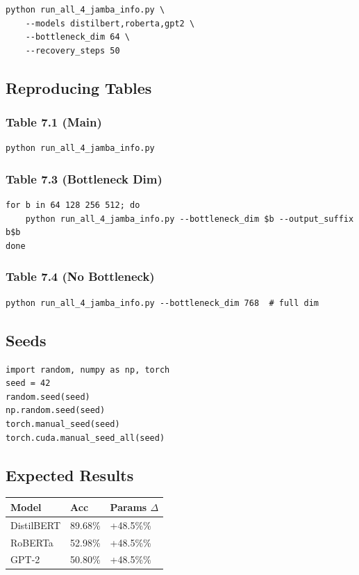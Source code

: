 \begin{lstlisting}
python run_all_4_jamba_info.py \
    --models distilbert,roberta,gpt2 \
    --bottleneck_dim 64 \
    --recovery_steps 50
\end{lstlisting}

\subsection{Reproducing Tables}

\subsubsection{Table 7.1 (Main)}
\begin{lstlisting}
python run_all_4_jamba_info.py
\end{lstlisting}

\subsubsection{Table 7.3 (Bottleneck Dim)}
\begin{lstlisting}
for b in 64 128 256 512; do
    python run_all_4_jamba_info.py --bottleneck_dim $b --output_suffix b$b
done
\end{lstlisting}

\subsubsection{Table 7.4 (No Bottleneck)}
\begin{lstlisting}
python run_all_4_jamba_info.py --bottleneck_dim 768  # full dim
\end{lstlisting}

\subsection{Seeds}

\begin{lstlisting}
import random, numpy as np, torch
seed = 42
random.seed(seed)
np.random.seed(seed)
torch.manual_seed(seed)
torch.cuda.manual_seed_all(seed)
\end{lstlisting}

\subsection{Expected Results}

\begin{table}[H]
\centering
\small
\begin{tabular}{lll}
\toprule
\textbf{Model} & \textbf{Acc} & \textbf{Params $\Delta$} \\
\midrule
DistilBERT & 89.68\% & +48.5\%\% \\
RoBERTa & 52.98\% & +48.5\%\% \\
GPT-2 & 50.80\% & +48.5\%\% \\
\bottomrule
\end{tabular}
\end{table}

